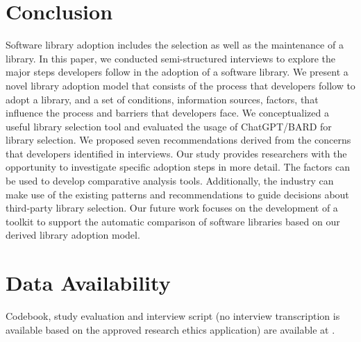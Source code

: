 
\section{Conclusion}
Software library adoption includes the selection as well as the maintenance of a library. In this paper, we conducted \numInterviews semi-structured interviews to explore the major steps developers follow in the adoption of a software library. We present a novel library adoption model that consists of the process that developers follow to adopt a library, and a set of conditions, information sources, factors, \principle\space that influence the process and barriers that developers face. We conceptualized a useful library selection tool and evaluated the usage of ChatGPT/BARD for library selection.
We proposed seven recommendations derived from the concerns that developers identified in interviews. Our study provides researchers with the opportunity to investigate specific adoption steps in more detail. The factors can be used to develop comparative analysis tools. Additionally, the industry can make use of the existing patterns and recommendations to guide decisions about third-party library selection. Our future work focuses on the development of a toolkit to support the automatic comparison of software libraries based on our derived library adoption model.

\section{Data Availability}
Codebook, study evaluation and interview script (no interview transcription is available based on the approved research ethics application) are available at \cite{website:replication-package}.


